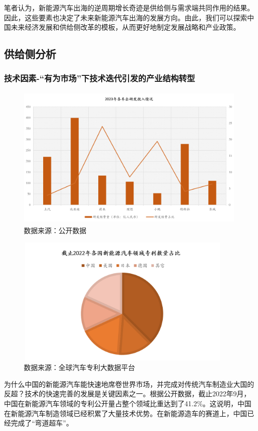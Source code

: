 \documentclass[a4paper, 10pt]{article}
\begin{document}
    笔者认为，新能源汽车出海的逆周期增长奇迹是供给侧与需求端共同作用的结果。因此，这些要素也决定了未来新能源汽车出海的发展方向。由此，我们可以探索中国未来经济发展和供给侧改革的模板，从而更好地制定发展战略和产业政策。
\subsection{供给侧分析}
  \subsubsection{技术因素-“有为市场”下技术迭代引发的产业结构转型}
  \begin{figure}[ht]
    \centering 
    \includegraphics[height=7cm,width=11.5cm]{fg3.png}
    
    \caption{数据来源：公开数据}
    \label{3}
    
    \end{figure}
    \begin{figure}[ht]
      \centering 
      \includegraphics[height=6.3cm,width=10.5cm]{fg4.png}
      
      \caption{数据来源：全球汽车专利大数据平台}
      \label{4}
      
      \end{figure}
    为什么中国的新能源汽车能快速地席卷世界市场，并完成对传统汽车制造业大国的反超？技术的快速完善的发展是关键因素之一。根据公开数据，截止2022年9月，中国在新能源汽车领域的专利公开量占整个领域比重达到了41.2\%。这说明，中国在新能源汽车制造领域已经积累了大量技术优势。在新能源造车的赛道上，中国已经完成了“弯道超车”。
    
\end{document}
